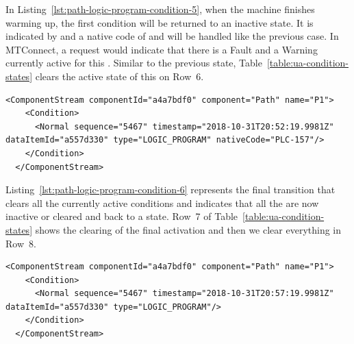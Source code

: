 In Listing~\ref{lst:path-logic-program-condition-5}, when the machine finishes warming up, the first condition will be returned to an inactive state. It is indicated by  and a native code of  and will be handled like the previous case. In MTConnect, a  request would indicate that there is a Fault and a Warning currently active for this . Similar to the previous state, Table~\ref{table:ua-condition-states} clears the active state of this  on Row~6.

\begin{lstlisting}[firstnumber=last,escapechar=|,%
    caption={Path Logic Program Clear Warning PLC-157},label={lst:path-logic-program-condition-5}]
  <ComponentStream componentId="a4a7bdf0" component="Path" name="P1">
    <Condition>
      <Normal sequence="5467" timestamp="2018-10-31T20:52:19.9981Z" dataItemId="a557d330" type="LOGIC_PROGRAM" nativeCode="PLC-157"/>
    </Condition>
  </ComponentStream>
\end{lstlisting}

Listing~\ref{lst:path-logic-program-condition-6} represents the final  transition that clears all the currently active conditions and indicates that all the  are now inactive or cleared and back to a  state. Row~7 of Table~\ref{table:ua-condition-states} shows the clearing of the final activation and then we clear everything in Row~8.

\begin{lstlisting}[firstnumber=last,escapechar=|,%
    caption={Path Logic Program Back to Normal, All Clear},label={lst:path-logic-program-condition-6}]
  <ComponentStream componentId="a4a7bdf0" component="Path" name="P1">
    <Condition>
      <Normal sequence="5467" timestamp="2018-10-31T20:57:19.9981Z" dataItemId="a557d330" type="LOGIC_PROGRAM"/>
    </Condition>
  </ComponentStream>
\end{lstlisting}


